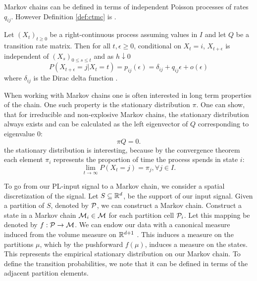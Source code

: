 Markov chains can be defined in terms of  independent Poisson processes
of rates $q_{ij}$. However Definition \ref{def:ctmc} is .

\begin{defn}
	\label{def:ctmc}
	Let $(X_t)_{t \ge 0}$ be a right-continuous process assuming values in $I$ and let $Q$
	be a transition rate matrix. Then for all $t, \epsilon \ge 0$, conditional on $X_t = i$,
	$X_{t+\epsilon}$ is independent of $(X_s)_{0 \le s \le t}$ and as $h \downarrow 0$
	\begin{equation}
		\nonumber
		P(X_{t+\epsilon} = j | X_t = t) = p_{ij}(\epsilon) = \delta_{ij} + q_{ij}\epsilon + o(\epsilon)
	\end{equation}
	where $\delta_{ij}$ is the Dirac delta function \cite{norris1998markov}.
\end{defn}
When working with Markov
chains one is often interested in long term properties of the chain. One such property is the
stationary distribution $\pi$. One can show, that for irreducible and non-explosive Markov chains,
the stationary distribution always exists \cite{norris1998markov} and can be calculated as the left eigenvector of $Q$ 
corresponding to eigenvalue $0$:
\begin{equation}
	\nonumber
	\pi Q = 0.
\end{equation}
 the stationary distribution is interesting, because by the convergence theorem
\cite{aldous-fill-2014}
each element $\pi_i$ represents the proportion of time the process spends in state $i$:
\begin{equation}
	\nonumber
	\lim\limits_{t \rightarrow \infty} P(X_t = j) = \pi_j, \forall j \in I.
\end{equation}

To go from our PL-input signal to a Markov chain, we consider a spatial discretization of the signal.
Let $S\subseteq \mathbb{R}^d$, be the support of our input signal. Given a partition of $S$, denoted by  $\mathcal{P}$, 
we can construct a Markov chain. Construct a  state in a Markov chain $\mathcal{M}_i \in \mathcal{M}$ for each  partition cell $\mathcal{P}_i$. Let this mapping be denoted by $f:\mathcal{P} \rightarrow \mathcal{M}$. We can endow our data with a canonical measure induced from the volume measure on $\mathbb{R}^{d+1}$ . This induces a measure on the partitions $\mu$, which by the  pushforward $f(\mu)$, induces a measure on the states. This represents the empirical stationary distribution on our Markov chain. To define the transition probabilities, we note that it can be defined in terms of the adjacent partition elements.  

